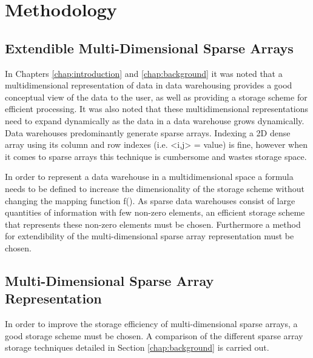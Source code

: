 %
%
%
%   
%
%
\chapter{Methodology} \label{chap:methodology}
\vspace{-1cm}

\section{Extendible Multi-Dimensional Sparse Arrays}
In Chapters \ref{chap:introduction} and \ref{chap:background} it was noted that a multidimensional representation of data in data warehousing provides a good conceptual view of the data to the user, as well as providing a storage scheme for efficient processing. It was also noted that these multidimensional representations need to expand dynamically as the data in a data warehouse grows dynamically. Data warehouses predominantly generate sparse arrays. Indexing a 2D dense array using its column and row indexes (i.e. <i,j> = value) is fine, however when it comes to sparse arrays this technique is cumbersome and wastes storage space.

In order to represent a data warehouse in a multidimensional space a formula needs to be defined to increase the dimensionality of the storage scheme without changing the mapping function f(). As sparse data warehouses consist of large quantities of information with few non-zero elements, an efficient storage scheme that represents these non-zero elements must be chosen. Furthermore a method for extendibility of the multi-dimensional sparse array representation must be chosen.

\section{Multi-Dimensional Sparse Array Representation}
In order to improve the storage efficiency of multi-dimensional sparse arrays, a good storage scheme must be chosen. A comparison of the different sparse array storage techniques detailed in Section \ref{chap:background} is carried out.

